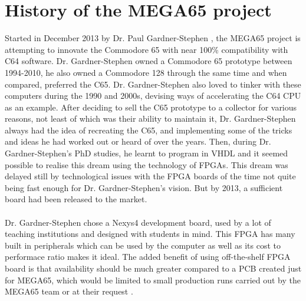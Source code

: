 \section{History of the MEGA65 project}
Started in December 2013 by Dr. Paul Gardner-Stephen \cite{blogjan14}, the MEGA65 project is attempting to innovate the Commodore 65 with near 100\% compatibility with C64 software. Dr. Gardner-Stephen  owned a Commodore 65 prototype between 1994-2010, he also owned a Commodore 128 through the same time and when compared, preferred the C65. Dr. Gardner-Stephen also loved to tinker with these computers during the 1990 and 2000s, devising ways of accelerating the C64 CPU as an example. After deciding to sell the C65 prototype to a collector for various reasons, not least of which was their ability to maintain it, Dr. Gardner-Stephen always had the idea of recreating the C65, and implementing some of the tricks and ideas he had worked out or heard of over the years. Then, during Dr. Gardner-Stephen's PhD studies, he learnt to program in VHDL and it seemed possible to realise this dream using the technology of FPGAs. This dream was delayed still by technological issues with the FPGA boards of the time not quite being fast enough for Dr. Gardner-Stephen's vision. But by 2013, a sufficient board had been released to the market. \\\\

Dr. Gardner-Stephen chose a Nexys4 development board, used by a lot of teaching institutions and designed with students in mind. This FPGA has many built in peripherals which can be used by the computer as well as its cost to performace ratio makes it ideal. The added benefit of using off-the-shelf FPGA board is that availability should be much greater compared to a PCB created just for MEGA65, which would be limited to small production runs carried out by the MEGA65 team or at their request \cite{blog30jan14}. \\\\

